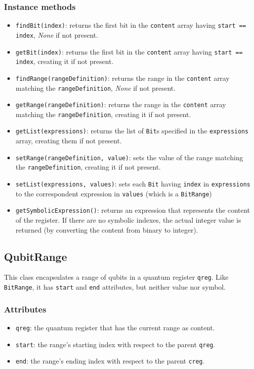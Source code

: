 \documentclass[12pt,a4paper]{report}
\theoremstyle{definition}
\theoremstyle{definition}
\theoremstyle{definition}
\begin{document}
\subsubsection{Instance methods}
\begin{itemize}
    \itemsep 0em
    \item \texttt{findBit(index)}: returns the first bit in the \texttt{content} array having \texttt{start == index}, \textit{None} if not present.
    \item \texttt{getBit(index)}: returns the first bit in the \texttt{content} array having \texttt{start == index}, creating it if not present.
    \item \texttt{findRange(rangeDefinition)}: returns the range in the \texttt{content} array matching the \texttt{rangeDefinition}, \textit{None} if not present.
    \item \texttt{getRange(rangeDefinition)}: returns the range in the \texttt{content} array matching the \texttt{rangeDefinition}, creating it if not present.
    \item \texttt{getList(expressions)}: returns the list of \texttt{Bit}s specified in the \texttt{expressions} array, creating them if not present.
    \item \texttt{setRange(rangeDefinition, value)}: sets the value of the range matching the \texttt{rangeDefinition}, creating it if not present.
    \item \texttt{setList(expressions, values)}: sets each \texttt{Bit} having \texttt{index} in \texttt{expressions} to the correspondent expression in \texttt{values} (which is a \texttt{BitRange})
    \item \texttt{getSymbolicExpression()}: returns an expression that represents the content of the register. If there are no symbolic indexes, the actual integer value is returned (by converting the content from binary to integer).
\end{itemize}






\subsection{QubitRange}
This class encapsulates a range of qubits in a quantum register \texttt{qreg}. Like \texttt{BitRange}, it has \texttt{start} and \texttt{end} attributes, but neither value nor symbol.
\subsubsection{Attributes}
\begin{itemize}
    \itemsep 0em
    \item \texttt{qreg}: the quantum register that has the current range as content.
    \item \texttt{start}: the range's starting index with respect to the parent \texttt{qreg}.
    \item \texttt{end}: the range's ending index with respect to the parent \texttt{creg}.
\end{itemize}
\end{document}
